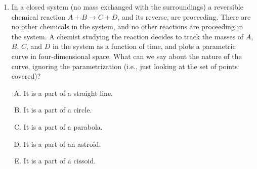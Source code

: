\documentclass[10pt]{amsart}
\begin{document}
\begin{enumerate}
  \begin{enumerate}[(A)]
  \item The norm (length) of the vector every day (after the first) is
    less than the norm of the vector the previous day.
  \item The sum of the coordinates of the vector every day (after the
    first) is less than the sum of the coordinates of the vector the
    previous day.
  \item The minimum of the coordinates of the vector every day (after
    the first) is less than the minimum of the coordinates of the
    vector the previous day.
  \item The maximum of the coordinates of the vector every day (after
    the first) is less than the maximum of the coordinates of the
    vector the previous day.
  \item Each of the coordinates of the vector every day (after the
    first) is less than the corresponding coordinate of the vector the
    previous day.
  \end{enumerate}

  {\em Answer}: Option (E)

  {\em Explanation}: If each of the coordinates goes down, then all
  the measures (the maximum, minimum and various average measures) go
  down. However, it is possible for any one of these measures to go
  down while the others don't.

  {\em Performance review}: $20$ out of $23$ got this. $3$ chose (B).

\item In a closed system (no mass exchanged with the surroundings) a
  reversible chemical reaction $A + B \to C + D$, and its reverse, are
  proceeding. There are no other chemicals in the system, and no other
  reactions are proceeding in the system. A chemist studying the
  reaction decides to track the masses of $A$, $B$, $C$, and $D$ in
  the system as a function of time, and plots a parametric curve in
  four-dimensional space. What can we say about the nature of the
  curve, ignoring the parametrization (i.e., just looking at the set
  of points covered)?


  \begin{enumerate}[(A)]
  \item It is a part of a straight line.
  \item It is a part of a circle.
  \item It is a part of a parabola.
  \item It is a part of an astroid.
  \item It is a part of a cissoid.
  \end{enumerate}


\end{enumerate}
\end{document}
